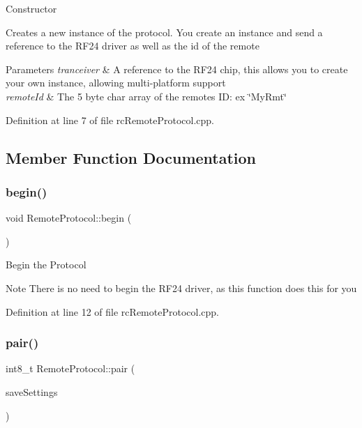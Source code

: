 Constructor

Creates a new instance of the protocol. You create an instance and send a reference to the R\+F24 driver as well as the id of the remote


\begin{DoxyParams}{Parameters}
{\em tranceiver} & A reference to the R\+F24 chip, this allows you to create your own instance, allowing multi-\/platform support \\
\hline
{\em remote\+Id} & The 5 byte char array of the remotes ID\+: ex \char`\"{}\+My\+Rmt\char`\"{} \\
\hline
\end{DoxyParams}


Definition at line 7 of file rc\+Remote\+Protocol.\+cpp.



\subsection{Member Function Documentation}
\mbox{\label{classRemoteProtocol_ac59aca8e8ce184ea9b46187e92708027}} 
\subsubsection{\texorpdfstring{begin()}{begin()}}
{\footnotesize\ttfamily void Remote\+Protocol\+::begin (\begin{DoxyParamCaption}{ }\end{DoxyParamCaption})}

Begin the Protocol

\begin{DoxyNote}{Note}
There is no need to begin the R\+F24 driver, as this function does this for you 
\end{DoxyNote}


Definition at line 12 of file rc\+Remote\+Protocol.\+cpp.

\mbox{\label{classRemoteProtocol_ac35879305b9a753c2b630979e4fb4aee}} 
\subsubsection{\texorpdfstring{pair()}{pair()}}
{\footnotesize\ttfamily int8\+\_\+t Remote\+Protocol\+::pair (\begin{DoxyParamCaption}\item[{\hyperlink{classRemoteProtocol_ab9e87c74f439c0cadd0823afb1509d55}{Remote\+Protocol\+::save\+Settings}}]{save\+Settings }\end{DoxyParamCaption})}

